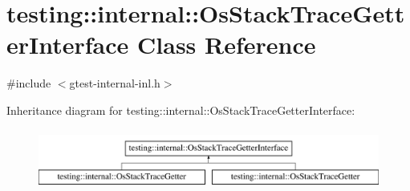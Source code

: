 \hypertarget{classtesting_1_1internal_1_1_os_stack_trace_getter_interface}{\section{testing\-:\-:internal\-:\-:Os\-Stack\-Trace\-Getter\-Interface Class Reference}
\label{classtesting_1_1internal_1_1_os_stack_trace_getter_interface}
}


{\ttfamily \#include $<$gtest-\/internal-\/inl.\-h$>$}

Inheritance diagram for testing\-:\-:internal\-:\-:Os\-Stack\-Trace\-Getter\-Interface\-:\begin{figure}[H]
\begin{center}
\leavevmode
\includegraphics[height=2.000000cm]{classtesting_1_1internal_1_1_os_stack_trace_getter_interface}
\end{center}
\end{figure}
